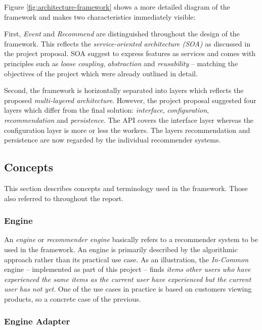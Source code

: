 Figure \ref{fig:architecture-framework} shows a more detailed diagram of the framework and makes two characteristics immediately visible:

First, \emph{Event} and \emph{Recommend} are distinguished throughout the design of the framework. This reflects the \emph{service-oriented architecture (SOA)} as discussed in the project proposal. SOA suggest to express features as services and comes with principles such as \emph{loose coupling}, \emph{abstraction} and \emph{reusability} -- matching the objectives of the project which were already outlined in detail.

Second, the framework is horizontally separated into layers which reflects the proposed \emph{multi-layered architecture}. However, the project proposal suggested four layers which differ from the final solution: \emph{interface}, \emph{configuration}, \emph{recommendation} and \emph{persistence}. The API covers the interface layer whereas the configuration layer is more or less the workers. The layers recommendation and persistence are now regarded by the individual recommender systems.

\subsection{Concepts}

This section describes concepts and terminology used in the framework. Those also referred to throughout the report.

\subsubsection{Engine}

An \emph{engine} or \emph{recommender engine} basically refers to a recommender system to be used in the framework. An engine is primarily described by the algorithmic approach rather than its practical use case. As an illustration, the \emph{In-Common} engine -- implemented as part of this project -- finds \emph{items other users who have experienced the same items as the current user have experienced but the current user has not yet}. One of the use cases in practice is based on customers viewing products, so a concrete case of the previous.

\subsubsection{Engine Adapter}

